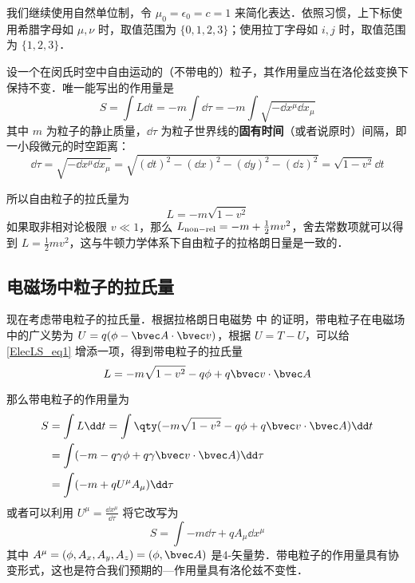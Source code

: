
我们继续使用自然单位制，令 $\mu_0=\epsilon_0=c=1$ 来简化表达．依照习惯，上下标使用希腊字母如 $\mu, \nu$ 时，取值范围为 $\{0, 1, 2, 3\}$；使用拉丁字母如 $i, j$ 时，取值范围为 $\{1, 2, 3\}$．

设一个在闵氏时空中自由运动的（不带电的）粒子，其作用量应当在洛伦兹变换下保持不变．唯一能写出的作用量是
\begin{equation}
S=\int L\dd t=-m\int \dd \tau=-m\int \sqrt{-\dd x^\mu \dd x_\mu}
\end{equation}
其中 $m$ 为粒子的静止质量，$\dd \tau$ 为粒子世界线的\textbf{固有时间}（或者说原时）间隔，即一小段微元的时空距离：
\begin{equation}
\dd \tau=\sqrt{-\dd x^\mu\dd x_\mu}=\sqrt{(\dd t)^2-(\dd x)^2-(\dd y)^2-(\dd z)^2}=\sqrt{1-v^2}\dd t
\end{equation}

所以自由粒子的拉氏量为
\begin{equation}\label{ElecLS_eq1}
L=-m\sqrt{1-v^2}
\end{equation}
如果取非相对论极限 $v\ll 1$，那么 $L_{\rm{non-rel}}=-m+\frac{1}{2}mv^2$，舍去常数项就可以得到 $L=\frac{1}{2}mv^2$，这与牛顿力学体系下自由粒子的拉格朗日量是一致的．
\subsection{电磁场中粒子的拉氏量}
现在考虑带电粒子的拉氏量．根据拉格朗日电磁势 中  的证明，带电粒子在电磁场中的广义势为 $U=q(\phi-\bvec A\cdot \bvec v)$，根据 $U=T-U$，可以给\autoref{ElecLS_eq1} 增添一项，得到带电粒子的拉氏量
\begin{equation}\label{ElecLS_eq2}
L=-m\sqrt{1-v^2}-q\phi+q\bvec v\cdot \bvec A
\end{equation}

那么带电粒子的作用量为
\begin{equation}\label{ElecLS_eq3}
\begin{aligned}
S&=\int L\dd t=\int \qty(-m\sqrt{1-v^2}-q\phi +q\bvec v\cdot \bvec A)\dd t\\
&=\int (-m-q\gamma\phi+q\gamma\bvec v\cdot \bvec A)\dd \tau\\
&=\int (-m+qU^\mu A_\mu)\dd \tau
\end{aligned}
\end{equation}
或者可以利用 $U^\mu= \frac{\dd x^\mu}{\dd \tau}$ 将它改写为
\begin{equation}
S=\int -m\dd \tau+qA_\mu \dd x^\mu
\end{equation}
其中 $A^\mu=(\phi,A_x,A_y,A_z)=(\phi,\bvec A)$ 是4-矢量势．带电粒子的作用量具有协变形式，这也是符合我们预期的—作用量具有洛伦兹不变性．

